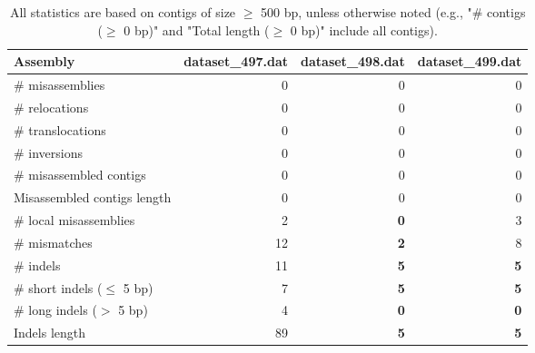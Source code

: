 \documentclass[12pt,a4paper]{article}
\begin{document}
\begin{table}[ht]
\begin{center}
\caption{All statistics are based on contigs of size $\geq$ 500 bp, unless otherwise noted (e.g., "\# contigs ($\geq$ 0 bp)" and "Total length ($\geq$ 0 bp)" include all contigs).}
\begin{tabular}{|l*{3}{|r}|}
\hline
Assembly & dataset\_497.dat & dataset\_498.dat & dataset\_499.dat \\ \hline
\# misassemblies & 0 & 0 & 0 \\ \hline
\hspace{5mm}\# relocations & 0 & 0 & 0 \\ \hline
\hspace{5mm}\# translocations & 0 & 0 & 0 \\ \hline
\hspace{5mm}\# inversions & 0 & 0 & 0 \\ \hline
\# misassembled contigs & 0 & 0 & 0 \\ \hline
Misassembled contigs length & 0 & 0 & 0 \\ \hline
\# local misassemblies & 2 & {\bf 0} & 3 \\ \hline
\# mismatches & 12 & {\bf 2} & 8 \\ \hline
\# indels & 11 & {\bf 5} & {\bf 5} \\ \hline
\hspace{5mm}\# short indels ($\leq$ 5 bp) & 7 & {\bf 5} & {\bf 5} \\ \hline
\hspace{5mm}\# long indels ($>$ 5 bp) & 4 & {\bf 0} & {\bf 0} \\ \hline
Indels length & 89 & {\bf 5} & {\bf 5} \\ \hline
\end{tabular}
\end{center}
\end{table}
\end{document}
